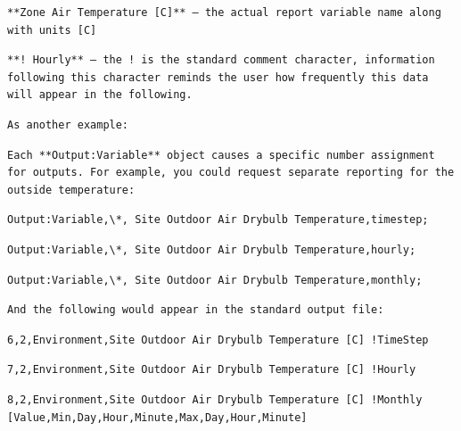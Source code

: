 \begin{lstlisting}
**Zone Air Temperature [C]** – the actual report variable name along with units [C]
\end{lstlisting}

\begin{lstlisting}
**! Hourly** – the ! is the standard comment character, information following this character reminds the user how frequently this data will appear in the following.
\end{lstlisting}

\begin{lstlisting}
As another example:
\end{lstlisting}

\begin{lstlisting}
Each **Output:Variable** object causes a specific number assignment for outputs. For example, you could request separate reporting for the outside temperature:
\end{lstlisting}

\begin{lstlisting}
Output:Variable,\*, Site Outdoor Air Drybulb Temperature,timestep;
\end{lstlisting}

\begin{lstlisting}
Output:Variable,\*, Site Outdoor Air Drybulb Temperature,hourly;
\end{lstlisting}

\begin{lstlisting}
Output:Variable,\*, Site Outdoor Air Drybulb Temperature,monthly;
\end{lstlisting}

\begin{lstlisting}
And the following would appear in the standard output file:
\end{lstlisting}

\begin{lstlisting}
6,2,Environment,Site Outdoor Air Drybulb Temperature [C] !TimeStep
\end{lstlisting}

\begin{lstlisting}
7,2,Environment,Site Outdoor Air Drybulb Temperature [C] !Hourly
\end{lstlisting}

\begin{lstlisting}
8,2,Environment,Site Outdoor Air Drybulb Temperature [C] !Monthly [Value,Min,Day,Hour,Minute,Max,Day,Hour,Minute]
\end{lstlisting}

